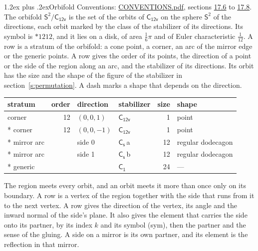 \documentclass[10pt,a4paper]{article}
\makeatletter
\renewcommand\section{\@startsection{section}{1}{\z@}{-3ex plus -1ex minus -.2ex}%
  {1.2ex plus .2ex}{\normalfont\large\sffamily\bfseries\color{parttitle}}}
\numberwithin{equation}{section}
\newcommand{\grp}[1]{\mathsf{#1}}
\newcommand{\orbname}[1]{#1}
\newcommand{\clsletter}[1]{\,{\scriptsize\color{black!55}#1}}
\newcommand{\dirvec}[3]{(#1, #2, #3)}
\newcommand{\twosphere}{\mathsf{S}^{2}}
\makeatother
\begin{document}
\section{Orbifold}\label{s:orbifold}
Conventions: \href{../../CONVENTIONS.pdf}{CONVENTIONS.pdf}, sections \href{../../CONVENTIONS.pdf\#conv.17.6}{17.6} to \href{../../CONVENTIONS.pdf\#conv.17.8}{17.8}.
The orbifold $\twosphere/\grp{C_{12v}}$ is the set of the orbits of $\grp{C_{12v}}$ on the sphere $\twosphere$ of the directions, each orbit marked by the class of the stabilizer of its directions. Its symbol is $\orbname{{\ast}1212}$, and it lies on a disk, of area $\tfrac{1}{6}\pi$ and of Euler characteristic $\tfrac{1}{12}$.
\leavevmode\label{n:head.stratum}\label{n:head.order.point}\label{n:head.direction}\label{n:head.stabilizer}\label{n:head.size.orbit}\label{n:head.shape}A row is a stratum of the orbifold: a cone point, a corner, an arc of the mirror edge or the generic points. A row gives the order of its points, the direction of a point or the side of the region along an arc, and the stabilizer of its directions. Its orbit has the size and the shape of the figure of the stabilizer in section~\ref{s:permutation}. A dash marks a shape that depends on the direction.
{\small\setlength{\tabcolsep}{4pt}\begin{longtable}{@{}lrllrl@{}}\toprule
stratum & order & direction & stabilizer & size & shape\\\midrule\endhead
\bottomrule\endfoot\endlastfoot
corner & 12 & $\dirvec{0}{0}{1}$ & \href{C12v.pdf}{$\grp{C_{12v}}$} & 1 & point\\*
corner & 12 & $\dirvec{0}{0}{-1}$ & \href{C12v.pdf}{$\grp{C_{12v}}$} & 1 & point\\*
mirror arc &  & side 0 & \href{C1v.pdf}{$\grp{C_{s}}$}\clsletter{a} & 12 & regular dodecagon\\*
mirror arc &  & side 1 & \href{C1v.pdf}{$\grp{C_{s}}$}\clsletter{b} & 12 & regular dodecagon\\*
generic &  &  & \href{C1.pdf}{$\grp{C_{1}}$} & 24 & ---\\
\bottomrule\end{longtable}}
\leavevmode\label{n:head.vertex.region}\label{n:head.angle}\label{n:head.normal.side}\label{n:head.partner}\label{n:head.sense}The region meets every orbit, and an orbit meets it more than once only on its boundary. A row is a vertex of the region together with the side that runs from it to the next vertex. A row gives the direction of the vertex, its angle and the inward normal of the side's plane. It also gives the element that carries the side onto its partner, by its index $k$ and its symbol (sym), then the partner and the sense of the gluing. A side on a mirror is its own partner, and its element is the reflection in that mirror.
\end{document}
